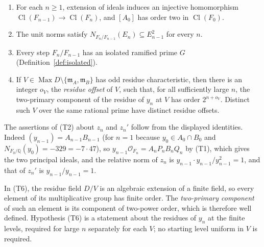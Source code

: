 \documentclass[11pt]{article}
\theoremstyle{plain}
\theoremstyle{definition}
\theoremstyle{remark}
\DeclareMathOperator{\Cl}{Cl}
\DeclareMathOperator{\Max}{Max}
\newcommand{\Q}{\mathbb Q}
\newcommand{\OO}{\mathcal O}
\newcommand{\EA}{\mathfrak m_A}
\newcommand{\EB}{\mathfrak m_B}
\begin{document}
\begin{enumerate}
\item[\textup{(T3)}] For each $n\geq1$, extension of ideals induces an
injective homomorphism $\Cl(F_{n-1})\to\Cl(F_n)$, and $[A_0]$ has order
two in $\Cl(F_0)$.

\item[\textup{(T4)}] The unit norms satisfy
$N_{F_n/F_{n-1}}(E_n)\subseteq E_{n-1}^{2}$ for every $n$.

\item[\textup{(T5)}] Every step $F_n/F_{n-1}$ has an isolated ramified
prime $G$ (Definition~\ref{def:isolated}).

\item[\textup{(T6)}] If $V\in\Max D\setminus\{\EA,\EB\}$ has odd residue
characteristic, then there is an integer $o_V$, the \emph{residue offset}
of $V$, such that, for all sufficiently large $n$, the two-primary
component of the residue of $y_n$ at $V$ has order $2^{n+o_V}$.  Distinct
such $V$ over the same rational prime have distinct residue offsets.
\end{enumerate}

The assertions of (T2) about $z_n$ and $z_n'$ follow from the displayed
identities.  Indeed $(y_{n-1})=A_{n-1}B_{n-1}$ (for $n=1$ because
$y_0\in A_0\cap B_0$ and $N_{F_0/\Q}(y_0)=-329=-7\cdot47$), so $y_{n-1}\OO_{F_n}=A_nP_nB_nQ_n$ by (T1), which gives
the two principal ideals, and the relative norm of $z_n$ is
$y_{n-1}\cdot y_{n-1}/y_{n-1}^2=1$, and that of $z_n'$ is
$y_{n-1}/y_{n-1}=1$.

In (T6), the residue field $D/V$ is an algebraic extension of a finite
field, so every element of its multiplicative group has finite order.
The \emph{two-primary component} of such an element is its component of
two-power order, which is therefore well defined.  Hypothesis (T6) is a
statement about the residues of $y_n$ at the finite levels, required for
large $n$ separately for each $V$; no starting level uniform in $V$ is
required.
\end{document}
